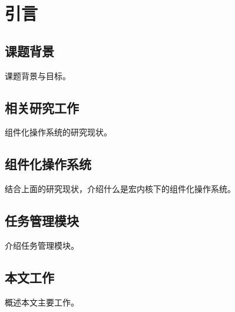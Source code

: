 
\chapter{引言}


\section{课题背景}

课题背景与目标。



\section{相关研究工作}

组件化操作系统的研究现状。



\section{组件化操作系统}

结合上面的研究现状，介绍什么是宏内核下的组件化操作系统。




\section{任务管理模块}

介绍任务管理模块。



\section{本文工作}

概述本文主要工作。